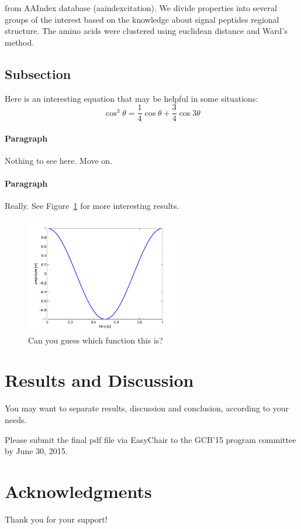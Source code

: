 \documentclass[fleqn,10pt,twoside]{gcb15submission}
\begin{document}
from AAIndex database (aaindexcitation). We divide properties into several groups of the interest based on the knowledge about signal peptides regional structure. The amino acids were clustered using euclidean distance and Ward's method.


\subsection*{Subsection}

Here is an interesting equation that may be helpful in some situations:
\begin{equation}
\cos^3 \theta =\frac{1}{4}\cos\theta+\frac{3}{4}\cos 3\theta
\label{eq:refname2}
\end{equation}

\paragraph{Paragraph}
Nothing to see here. Move on.

\paragraph{Paragraph}
Really.
See Figure~\ref{fig:results} for more interesting results.

\begin{figure}[ht]\centering
\includegraphics[width=0.6\textwidth]{results}
\caption{Can you guess which function this is?}
\label{fig:results}
\end{figure}



\section*{Results and Discussion}

You may want to separate results, discussion and conclusion, according to your needs.

Please submit the final pdf file via EasyChair to the GCB'15 program committee by June 30, 2015. 


\section*{Acknowledgments}
Thank you for your support!



\end{document}

